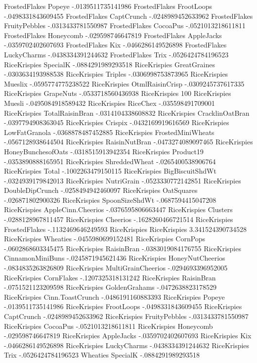 FrostedFlakes	Popeye	-.0139511735141986
FrostedFlakes	FrootLoops	-.0498331843609455
FrostedFlakes	CaptCrunch	-.0248989452633962
FrostedFlakes	FruityPebbles	-.0313433781550987
FrostedFlakes	CocoaPus	-.0521013218611811
FrostedFlakes	Honeycomb	-.029598746647819
FrostedFlakes	AppleJacks	-.0359702402607693
FrostedFlakes	Kix	-.0466286149526898
FrostedFlakes	LuckyCharms	-.0438334391244632
FrostedFlakes	Trix	-.0526424784196523
RiceKrispies	SpecialK	-.0884291989293518
RiceKrispies	GreatGraines	-.0303634193988538
RiceKrispies	Triples	-.0306998753873965
RiceKrispies	Mueslix	-.0595774775238522
RiceKrispies	OtmlRaisinCrisp	-.0309245737617335
RiceKrispies	GrapeNuts	-.0533718560436938
RiceKrispies	100%
RiceKrispies	Muesli	-.0495084918589432
RiceKrispies	RiceChex	-.035598491709001
RiceKrispies	TotalRaisinBran	-.0314104338608832
RiceKrispies	CracklinOatBran	-.0397794908363045
RiceKrispies	Crispix	-.0432169919616569
RiceKrispies	LowFatGranola	-.0368878487452885
RiceKrispies	FrostedMiniWheats	-.0567128938644504
RiceKrispies	RaisinNutBran	-.0473274089097465
RiceKrispies	HoneyBunchesofOats	-.0318515913942354
RiceKrispies	Product19	-.0353890888165951
RiceKrispies	ShreddedWheat	-.0265400538906764
RiceKrispies	Total	-.1002263479150115
RiceKrispies	BigBiscuitShdWt	-.0324939179842013
RiceKrispies	NutriGrain	-.0523330772142851
RiceKrispies	DoubleDipCrunch	-.0258494942460097
RiceKrispies	OatSquares	-.026871802900326
RiceKrispies	SpoonSizeShdWt	-.0687594415047208
RiceKrispies	AppleCinn.Cheerios	-.0376595806663447
RiceKrispies	Clusters	-.0288128967811457
RiceKrispies	Cheerios	-.1628260466721514
RiceKrispies	FrostedFlakes	-.1132469646249593
RiceKrispies	RiceKrispies	3.341524390734528
RiceKrispies	Wheaties	-.0455980699152481
RiceKrispies	CornPops	-.0602868603345475
RiceKrispies	RaisinBran	-.0383019084176755
RiceKrispies	CinnamonMiniBuns	-.0245871945621436
RiceKrispies	HoneyNutCheerios	-.0834835263826809
RiceKrispies	MultiGrainCheerios	-.0294693396952005
RiceKrispies	CornFlakes	-.1207325318131242
RiceKrispies	RaisinBran	-.0751521123209598
RiceKrispies	GoldenGrahams	-.0472638823178529
RiceKrispies	Cinn.ToastCrunch	-.0486191160883393
RiceKrispies	Popeye	-.0139511735141986
RiceKrispies	FrootLoops	-.0498331843609455
RiceKrispies	CaptCrunch	-.0248989452633962
RiceKrispies	FruityPebbles	-.0313433781550987
RiceKrispies	CocoaPus	-.0521013218611811
RiceKrispies	Honeycomb	-.029598746647819
RiceKrispies	AppleJacks	-.0359702402607693
RiceKrispies	Kix	-.0466286149526898
RiceKrispies	LuckyCharms	-.0438334391244632
RiceKrispies	Trix	-.0526424784196523
Wheaties	SpecialK	-.0884291989293518
